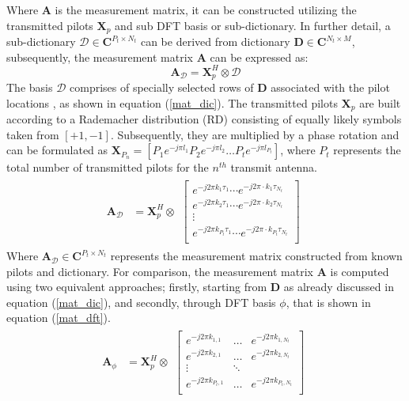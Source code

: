 Where $\mathbf{A}$ is the measurement matrix, it can be constructed utilizing the transmitted pilots $\mathbf{X}_p$  and sub DFT basis or sub-dictionary. In further detail, a sub-dictionary $\mathcal{D} \in \mathbf{C}^{P_t \times N_t}$ can be derived from dictionary $ \mathbf{D} \in \mathbf{C}^{N_t \times M}$,  subsequently, the measurement matrix $\mathbf{A}$ can be expressed as:
\begin{equation}
 \mathbf{A}_\mathcal{D}= \mathbf{X}_p^H \otimes \mathbf{\mathcal{D}}  
    \label{eq-Ad}
\end{equation}
The basis $\mathcal{D}$ comprises of specially selected rows of $\mathbf{D}$  associated with the pilot locations \cite{reviwsparse}, as shown in equation (\ref{mat_dic}). 
 The transmitted pilots $\mathbf{X}_p$ are built according to a Rademacher distribution (RD) consisting of equally likely symbols taken from $[+1,-1]$.  Subsequently, they are multiplied by a phase rotation and can be formulated as $\mathbf{X}_{P_n}=[ P_1e^{-j\pi l_1}  P_2e^{-j\pi l_2}  \hdots   P_te^{-j\pi l_{P_t}}]$, where $P_t$ represents the total number of transmitted pilots for the $n^{th}$ transmit antenna.
     \begin{align}
    \label{mat_dic}
    \mathbf{A}_{\mathcal{D}} &=  \mathbf{X}_p^H \otimes
    \begin{matrix}
    \begin{bmatrix}
    e^{-j2\pi k_1 \tau_1}\cdots e^{-j2\pi\cdot k_1\tau_{N_t}} \\
    e^{-j2\pi k_2\tau_1}\cdots e^{-j2\pi\cdot k_2\tau_{N_t}} \\
    \vdots  \\    
    e^{-j2\pi k_{P_t} \tau_1} \cdots e^{-j2\pi \cdot k_{P_t}\tau_{N_t}} \\
    \end{bmatrix} 
    \end{matrix}
    \end{align}
Where $\mathbf{A}_{\mathcal{D}} \in \mathbf{C}^{P_t \times N_t}$ represents  the measurement matrix constructed from known pilots and dictionary.
For comparison, the measurement matrix $\mathbf{A}$ is computed using two equivalent approaches; firstly, starting from $\mathbf{D}$ as already discussed in equation (\ref{mat_dic}), and secondly, through DFT basis \textbf{$\phi$}, that is shown in equation (\ref{mat_dft}). 
\begin{align}
     \mathbf{A}_\phi &= \mathbf{X}_p^H \otimes
     \begin{matrix}
     \label{mat_dft}
     \begin{bmatrix}
     e^{-j2\pi k_{1,1}} &\dots& e^{-j2\pi k_{1,N_t}} \\
     e^{-j2\pi k_{2,1}} &\dots& e^{-j2\pi k_{2,N_t}} \\
     \vdots & \ddots & \\                              
     e^{-j2\pi k_{{P_t},1}}  &\dots& e^{-j2\pi k_{{P_t},N_t}} \\
     \end{bmatrix}
     \end{matrix}
\end{align}
